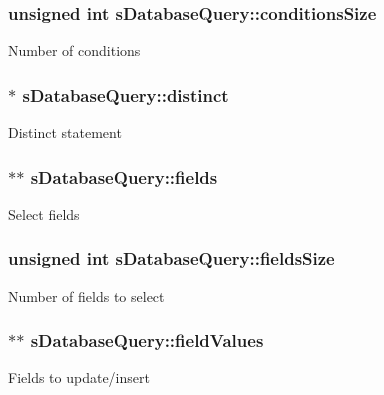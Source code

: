 \subsubsection[{\texorpdfstring{conditions\+Size}{conditionsSize}}]{\setlength{\rightskip}{0pt plus 5cm}unsigned int s\+Database\+Query\+::conditions\+Size}\hypertarget{structsDatabaseQuery_a7534216a1d5ad726447b73b6eb4fdbc4}{}\label{structsDatabaseQuery_a7534216a1d5ad726447b73b6eb4fdbc4}
Number of conditions 
\subsubsection[{\texorpdfstring{distinct}{distinct}}]{$\ast$ s\+Database\+Query\+::distinct}\hypertarget{structsDatabaseQuery_af873390ab854ce4a34f704971d271521}{}\label{structsDatabaseQuery_af873390ab854ce4a34f704971d271521}
Distinct statement 
\subsubsection[{\texorpdfstring{fields}{fields}}]{$\ast$$\ast$ s\+Database\+Query\+::fields}\hypertarget{structsDatabaseQuery_a2075e002e2ecbf166d9fbcc6f9780701}{}\label{structsDatabaseQuery_a2075e002e2ecbf166d9fbcc6f9780701}
Select fields 
\subsubsection[{\texorpdfstring{fields\+Size}{fieldsSize}}]{\setlength{\rightskip}{0pt plus 5cm}unsigned int s\+Database\+Query\+::fields\+Size}\hypertarget{structsDatabaseQuery_a052737bce106f2758ba5d5ac663ff57a}{}\label{structsDatabaseQuery_a052737bce106f2758ba5d5ac663ff57a}
Number of fields to select 
\subsubsection[{\texorpdfstring{field\+Values}{fieldValues}}]{$\ast$$\ast$ s\+Database\+Query\+::field\+Values}\hypertarget{structsDatabaseQuery_a7bf7cf5cda36b6c6d3701926c35d8972}{}\label{structsDatabaseQuery_a7bf7cf5cda36b6c6d3701926c35d8972}
Fields to update/insert 
